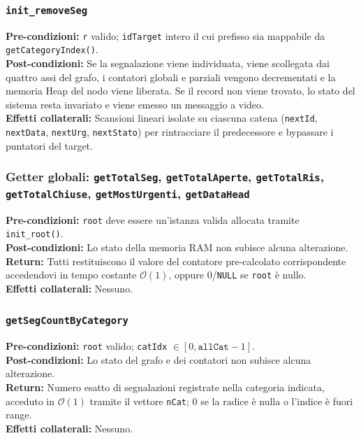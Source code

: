 \documentclass[12pt, a4paper]{article}
\begin{document}
\subsubsection{\texttt{init\_removeSeg}}
\vspace{3mm}
\begin{specbox}
\textbf{Pre-condizioni:} \texttt{r} valido; \texttt{idTarget} intero il cui prefisso sia mappabile da \texttt{getCategoryIndex()}. \\
\textbf{Post-condizioni:} Se la segnalazione viene individuata, viene scollegata dai quattro assi del grafo, i contatori globali e parziali vengono decrementati e la memoria Heap del nodo viene liberata. Se il record non viene trovato, lo stato del sistema resta invariato e viene emesso un messaggio a video. \\
\textbf{Effetti collaterali:} Scansioni lineari isolate su ciascuna catena (\texttt{nextId}, \texttt{nextData}, \texttt{nextUrg}, \texttt{nextStato}) per rintracciare il predecessore e bypassare i puntatori del target.
\end{specbox}

\subsubsection{Getter globali: \texttt{getTotalSeg}, \texttt{getTotalAperte}, \texttt{getTotalRis}, \texttt{getTotalChiuse}, \texttt{getMostUrgenti}, \texttt{getDataHead}}
\vspace{3mm}
\begin{specbox}
\textbf{Pre-condizioni:} \texttt{root} deve essere un'istanza valida allocata tramite \texttt{init\_root()}. \\
\textbf{Post-condizioni:} Lo stato della memoria RAM non subisce alcuna alterazione. \\
\textbf{Return:} Tutti restituiscono il valore del contatore pre-calcolato corrispondente accedendovi in tempo costante $\mathcal{O}(1)$, oppure 0/\texttt{NULL} se \texttt{root} è nullo. \\
\textbf{Effetti collaterali:} Nessuno.
\end{specbox}

\subsubsection{\texttt{getSegCountByCategory}}
\vspace{3mm}
\begin{specbox}
\textbf{Pre-condizioni:} \texttt{root} valido; \texttt{catIdx} $\in [0, \texttt{allCat}-1]$. \\
\textbf{Post-condizioni:} Lo stato del grafo e dei contatori non subisce alcuna alterazione. \\
\textbf{Return:} Numero esatto di segnalazioni registrate nella categoria indicata, acceduto in $\mathcal{O}(1)$ tramite il vettore \texttt{nCat}; 0 se la radice è nulla o l'indice è fuori range. \\
\textbf{Effetti collaterali:} Nessuno.
\end{specbox}
\end{document}
